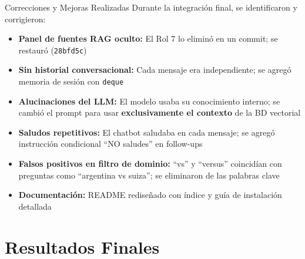 \documentclass[aspectratio=169, 11pt]{beamer}
\begin{document}
\begin{frame}{Correcciones y Mejoras Realizadas}
Durante la integración final, se identificaron y corrigieron:

\vspace{0.3cm}
\begin{itemize}
    \item \textbf{Panel de fuentes RAG oculto:} El Rol 7 lo eliminó en un commit; se restauró (\texttt{28bfd5c})
    \item \textbf{Sin historial conversacional:} Cada mensaje era independiente; se agregó memoria de sesión con \texttt{deque}
    \item \textbf{Alucinaciones del LLM:} El modelo usaba su conocimiento interno; se cambió el prompt para usar \textbf{exclusivamente el contexto} de la BD vectorial
    \item \textbf{Saludos repetitivos:} El chatbot saludaba en cada mensaje; se agregó instrucción condicional ``NO saludes'' en follow-ups
    \item \textbf{Falsos positivos en filtro de dominio:} ``vs'' y ``versus'' coincidían con preguntas como ``argentina vs suiza''; se eliminaron de las palabras clave
    \item \textbf{Documentación:} README rediseñado con índice y guía de instalación detallada
\end{itemize}
\end{frame}

\section{Resultados Finales}
\end{document}
